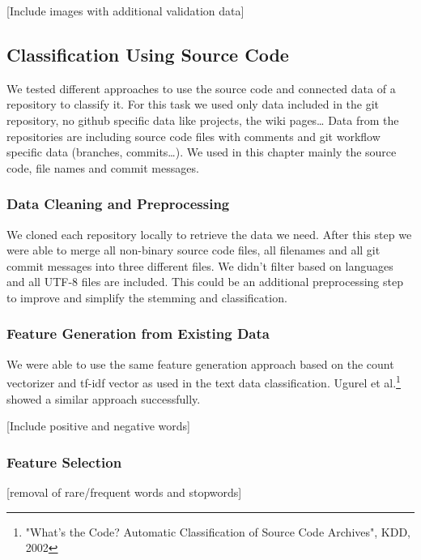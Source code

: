 \documentclass[%
a4paper,
DIV12,
2.5headlines,
bigheadings,
titlepage,
openbib,
]{scrartcl}
\begin{document}
{[}Include images with additional validation data{]}

\subsection{Classification Using Source
Code}\label{classification-using-source-code}

We tested different approaches to use the source code and connected data of a repository to classify it.
For this task we used only data included in the git repository, no github specific data like projects, the wiki pages\ldots{} Data from the repositories are including source code files with comments and git workflow specific data (branches, commits\ldots{}).
We used in this chapter mainly the source code, file names and commit messages.

\subsubsection{Data Cleaning and
Preprocessing}\label{data-cleaning-and-preprocessing-2}

We cloned each repository locally to retrieve the data we need.
After this step we were able to merge all non-binary source code files, all filenames and all git commit messages into three different files.
We didn't filter based on languages and all UTF-8 files are included.
This could be an additional preprocessing step to improve and simplify the stemming and classification.

\subsubsection{Feature Generation from Existing
Data}\label{feature-generation-from-existing-data-1}

We were able to use the same feature generation approach based on the count vectorizer and tf-idf vector as used in the text data classification.
Ugurel et al.\footnote{"What's the Code? Automatic Classification of Source Code Archives", KDD, 2002} showed a similar approach successfully.

[Include positive and negative words]

\subsubsection{Feature Selection}\label{feature-selection-2}

{[}removal of rare/frequent words and stopwords{]}
\end{document}
